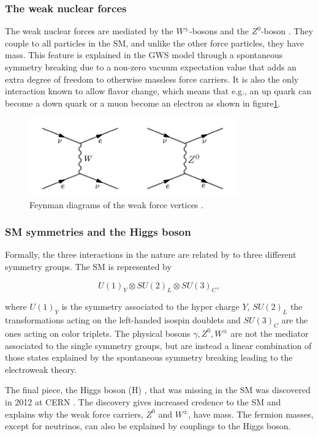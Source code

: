 \subsubsection{The weak nuclear forces}
The weak nuclear forces are mediated by the $W^\pm$-bosons and the $Z^0$-boson \cite{thomson}. They couple to all particles in the SM, and unlike the other force particles, they have mass. This feature is explained in the GWS model \cite{Xin2007GlashowWeinbergSalamMA} through a spontaneous symmetry breaking due to a non-zero vacuum expectation value that adds an extra degree of freedom to otherwise massless force carriers. It is also the only interaction known to allow flavor change, which means that e.g., an up quark can become a down quark or a muon become an electron as shown in figure\ref{fig:weak_force_FD}. 

\begin{figure}[H]
    \centering
    \includegraphics[width = 0.8\textwidth]{Figures/FeynmanDiagrams/weak.png}
    \caption{Feynman diagrams of the weak force vertices \cite{WEAKforce}.}
    \label{fig:weak_force_FD}
\end{figure}


\subsubsection{SM symmetries and the Higgs boson}
Formally, the three interactions in the nature are related by to three different symmetry groups. The SM is represented by

\begin{equation}
    U(1)_Y \otimes SU(2)_L \otimes SU(3)_C,
\end{equation}

where $U(1)_Y$ is the symmetry associated to the hyper charge $Y$, $SU(2)_L$ the transformations acting on the left-handed isospin doublets and $SU(3)_C$ are the ones acting on color triplets. The physical bosons $\gamma, Z^0, W^\pm$ are not the mediator associated to the single symmetry groups, but are instead a linear combination of those states explained by the spontaneous symmetry breaking leading to the electroweak theory. 

The final piece, the Higgs boson (H) \cite{thomson}, that was missing in the SM was discovered in 2012 at CERN \cite{Higgs_ATLAS, Higgs_CMS}. The discovery gives increased credence to the SM and explains why the weak force carriers, $Z^0$ and $ W^\pm $, have mass. The fermion masses, except for neutrinos, can also be explained by couplings to the Higgs boson. 

